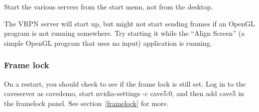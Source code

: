 \documentclass[11pt]{article}
\begin{document}
Start the various servers from the start menu, not from the desktop.

The VRPN server will start up, but might not start sending frames if
an OpenGL program is not running somewhere.  Try starting it while the
``Align Screen'' (a simple OpenGL program that uses no input)
application is running.


\subsubsection{Frame lock}

On a restart, you should check to see if the frame lock is still set.
Log in to the caveserver as cavedemo, start nvidia-settings -c
cave5:0, and then add cave5 in the framelock panel.   See
  section~\ref{framelock} for more.
\end{document}
